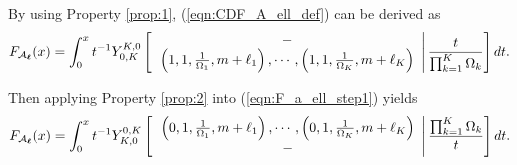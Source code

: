 \documentclass[12pt,onecolumn,draftcls]{IEEEtran}
\newcommand{\bs}{\boldsymbol}
\begin{document}
By using Property \ref{prop:1}, (\ref{eqn:CDF_A_ell_def}) can be derived as
\begin{equation}\label{eqn:F_a_ell_step1}
{F_{{{\cal A}_{\bs \ell} }}}(x) = \int_0^x {{t^{ - 1}}Y_{0,K}^{K,0}\left[ {\left. {\begin{array}{*{20}{c}}
 - \\
{\left( {1,1,\frac{1}{{{\Omega _1}}},m + {\ell _1}} \right), \cdots ,\left( {1,1,\frac{1}{{{\Omega _K}}},m + {\ell _K}} \right)}
\end{array}} \right|\frac{t}{{\prod\nolimits_{k = 1}^K {{\Omega _k}} }}} \right]dt}.
\end{equation}

Then applying Property \ref{prop:2} into (\ref{eqn:F_a_ell_step1}) yields
\begin{equation}\label{eqn:F_a_ell_step2}
{F_{{{\cal A}_{\bs \ell} }}}(x) = \int_0^x {{t^{ - 1}}Y_{K,0}^{0,K}\left[ {\left. {\begin{array}{*{20}{c}}
{\left( {0,1,\frac{1}{{{\Omega _1}}},m + {\ell _1}} \right), \cdots ,\left( {0,1,\frac{1}{{{\Omega _K}}},m + {\ell _K}} \right)}\\
 -
\end{array}} \right|\frac{{\prod\nolimits_{k = 1}^K {{\Omega _k}} }}{t}} \right]dt}.
\end{equation}
\end{document}
